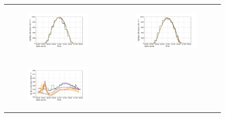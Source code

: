 \begin{figure}[hbtp]
    \centering
    \begin{tabular}{cc}
        \begin{subfigure}[t]{0.5\textwidth}
            \caption{}
            \includegraphics[width=\textwidth]{images/chap5/IOP_TS/TS_2021-07-15_elsplans_SWdnSFC.png}
        \end{subfigure} &
        \begin{subfigure}[t]{0.5\textwidth}
            \caption{}
            \includegraphics[width=\textwidth]{images/chap5/IOP_TS/TS_2021-07-20_elsplans_SWdnSFC.png}
        \end{subfigure} \\
        \begin{subfigure}[t]{0.5\textwidth}
            \caption{}
            \includegraphics[width=\textwidth]{images/chap5/IOP_TS/TS_2021-07-15_elsplans_LWdnSFC.png}

\end{subfigure}
\end{tabular}
\end{figure}

